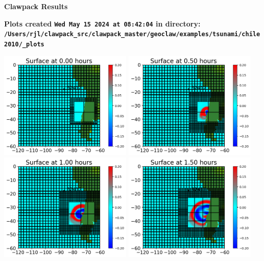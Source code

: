 \documentclass[11pt]{article}
\begin{document}
        \begin{center}{\Large\bf Clawpack Results}\vskip 5pt
        
        \bf Plots created {\tt Wed May 15 2024 at 08:42:04} in directory: \vskip 5pt
        \verb+/Users/rjl/clawpack_src/clawpack_master/geoclaw/examples/tsunami/chile2010/_plots+
        \end{center}
        \vskip 5pt
        \includegraphics[width=0.475\textwidth]{frame0000fig0.png}
\vskip 10pt 
\includegraphics[width=0.475\textwidth]{frame0001fig0.png}
\vskip 10pt 
\includegraphics[width=0.475\textwidth]{frame0002fig0.png}
\vskip 10pt 
\includegraphics[width=0.475\textwidth]{frame0003fig0.png}
\end{document}
